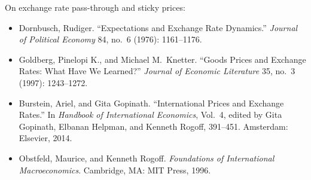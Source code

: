 \documentclass[12pt]{article}
\begin{document}
\noindent On exchange rate pass-through and sticky prices:

\begin{itemize}
    \item Dornbusch, Rudiger. ``Expectations and Exchange Rate 
    Dynamics.'' \emph{Journal of Political Economy} 84, no.\ 6 (1976): 
    1161--1176.
    
    \item Goldberg, Pinelopi K., and Michael M.\ Knetter. ``Goods 
    Prices and Exchange Rates: What Have We Learned?'' \emph{Journal of 
    Economic Literature} 35, no.\ 3 (1997): 1243--1272.
    
    \item Burstein, Ariel, and Gita Gopinath. ``International Prices 
    and Exchange Rates.'' In \emph{Handbook of International Economics}, 
    Vol.\ 4, edited by Gita Gopinath, Elbanan Helpman, and Kenneth 
    Rogoff, 391--451. Amsterdam: Elsevier, 2014.
    
    \item Obstfeld, Maurice, and Kenneth Rogoff. \emph{Foundations of 
    International Macroeconomics}. Cambridge, MA: MIT Press, 1996.
\end{itemize}
\end{document}
